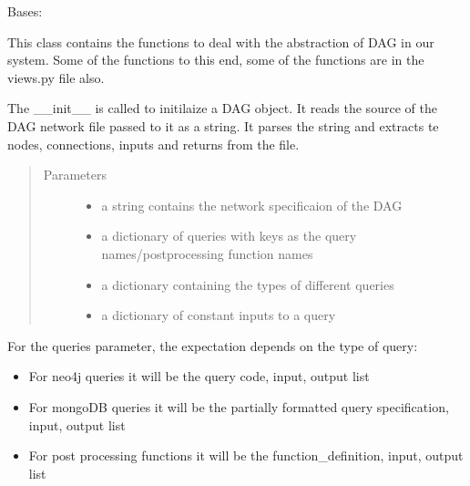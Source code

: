 \documentclass[letterpaper,10pt,english]{sphinxmanual}
\begin{document}
\begin{fulllineitems}
\label{\detokenize{dag:create_dag.DAG}}
Bases: 

This class contains the functions to deal with the abstraction of DAG in our system. Some of the functions
to this end, some of the functions are in the views.py file also.

The \_\_init\_\_ is called to initilaize a DAG object. It reads the source of the DAG network file passed to it as a string. It
parses the string and extracts te nodes, connections, inputs and returns from the file.
\begin{quote}\begin{description}
\item[{Parameters}] \leavevmode\begin{itemize}
\item {} 
 \textendash{} a string contains the network specificaion of the DAG

\item {} 
 \textendash{} a dictionary of queries with keys as the query names/postprocessing function names

\item {} 
 \textendash{} a dictionary containing the types of different queries

\item {} 
 \textendash{} a dictionary of constant inputs to a query

\end{itemize}

\end{description}\end{quote}

For the queries parameter, the expectation depends on the type of query:
\begin{itemize}
\item {} 
For neo4j queries it will be the query code, input, output list

\item {} 
For mongoDB queries it will be the partially formatted query specification, input, output list

\item {} 
For post processing functions it will be the function\_definition, input, output list


\end{itemize}
\end{fulllineitems}
\end{document}
